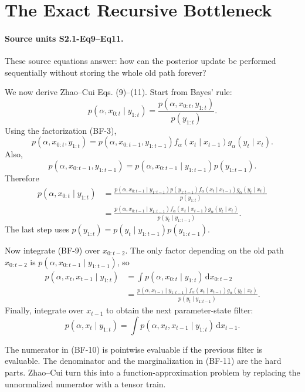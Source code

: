 \documentclass[11pt]{article}
\newcommand{\dd}{\,\mathrm d}
\begin{document}
\section{The Exact Recursive Bottleneck}

\paragraph{Source units S2.1-Eq9--Eq11.}
These source equations answer: how can the posterior update be performed
sequentially without storing the whole old path forever?

We now derive Zhao--Cui Eqs. (9)--(11).  Start from Bayes' rule:
\[
 p(\alpha,x_{0:t}\mid y_{1:t})
 =
 \frac{p(\alpha,x_{0:t},y_{1:t})}{p(y_{1:t})}.
\]
Using the factorization (BF-3),
\[
 p(\alpha,x_{0:t},y_{1:t})
 =
 p(\alpha,x_{0:t-1},y_{1:t-1})
 f_\alpha(x_t\mid x_{t-1})g_\alpha(y_t\mid x_t).
\]
Also,
\[
 p(\alpha,x_{0:t-1},y_{1:t-1})
 =
 p(\alpha,x_{0:t-1}\mid y_{1:t-1})p(y_{1:t-1}).
\]
Therefore
\[
\begin{aligned}
 p(\alpha,x_{0:t}\mid y_{1:t})
 &=
 \frac{
 p(\alpha,x_{0:t-1}\mid y_{1:t-1})p(y_{1:t-1})
 f_\alpha(x_t\mid x_{t-1})g_\alpha(y_t\mid x_t)}
 {p(y_{1:t})}\\
 &=
 \frac{
 p(\alpha,x_{0:t-1}\mid y_{1:t-1})
 f_\alpha(x_t\mid x_{t-1})g_\alpha(y_t\mid x_t)}
 {p(y_t\mid y_{1:t-1})}.
\end{aligned}
\tag{BF-9}
\]
The last step uses \(p(y_{1:t})=p(y_t\mid y_{1:t-1})p(y_{1:t-1})\).

Now integrate (BF-9) over \(x_{0:t-2}\).  The only factor depending on the old
path \(x_{0:t-2}\) is
\(p(\alpha,x_{0:t-1}\mid y_{1:t-1})\), so
\[
\begin{aligned}
 p(\alpha,x_t,x_{t-1}\mid y_{1:t})
 &=
 \int p(\alpha,x_{0:t}\mid y_{1:t})\dd x_{0:t-2}\\
 &=
 \frac{
 p(\alpha,x_{t-1}\mid y_{1:t-1})
 f_\alpha(x_t\mid x_{t-1})g_\alpha(y_t\mid x_t)}
 {p(y_t\mid y_{1:t-1})}.
\end{aligned}
\tag{BF-10}
\]
Finally, integrate over \(x_{t-1}\) to obtain the next parameter-state filter:
\[
    p(\alpha,x_t\mid y_{1:t})
    =
    \int p(\alpha,x_t,x_{t-1}\mid y_{1:t})\dd x_{t-1}.
    \tag{BF-11}
\]

The numerator in (BF-10) is pointwise evaluable if the previous filter is
evaluable.  The denominator and the marginalization in (BF-11) are the hard
parts.  Zhao--Cui turn this into a function-approximation problem by replacing
the unnormalized numerator with a tensor train.
\end{document}
